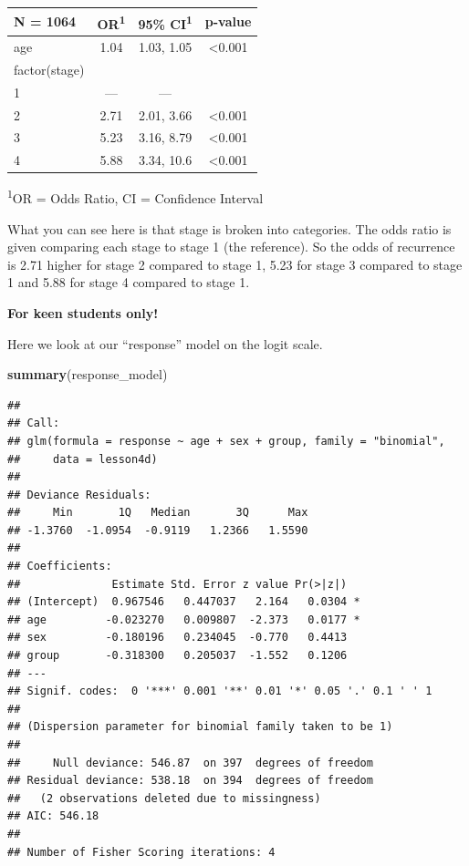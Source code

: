 \documentclass[]{book}
\newenvironment{Shaded}{\begin{snugshade}}{\end{snugshade}}
\newcommand{\KeywordTok}[1]{\textcolor[rgb]{0.13,0.29,0.53}{\textbf{#1}}}
\newcommand{\NormalTok}[1]{#1}
\begin{document}
\captionsetup[table]{labelformat=empty,skip=1pt}
\begin{longtable}{lccc}
\toprule
\textbf{N = 1064} & \textbf{OR}\textsuperscript{1} & \textbf{95\% CI}\textsuperscript{1} & \textbf{p-value} \\ 
\midrule
age & 1.04 & 1.03, 1.05 & <0.001 \\ 
factor(stage) &  &  &  \\ 
1 & --- & --- &  \\ 
2 & 2.71 & 2.01, 3.66 & <0.001 \\ 
3 & 5.23 & 3.16, 8.79 & <0.001 \\ 
4 & 5.88 & 3.34, 10.6 & <0.001 \\ 
\bottomrule
\end{longtable}
\vspace{-5mm}
\begin{minipage}{\linewidth}
\textsuperscript{1}OR = Odds Ratio, CI = Confidence Interval \\ 
\end{minipage}

What you can see here is that stage is broken into categories. The odds
ratio is given comparing each stage to stage 1 (the reference). So the
odds of recurrence is 2.71 higher for stage 2 compared to stage 1, 5.23
for stage 3 compared to stage 1 and 5.88 for stage 4 compared to stage
1.

\textbf{For keen students only!}

Here we look at our ``response'' model on the logit scale.

\begin{Shaded}
\begin{Highlighting}[]
\KeywordTok{summary}\NormalTok{(response_model)}
\end{Highlighting}
\end{Shaded}

\begin{verbatim}
## 
## Call:
## glm(formula = response ~ age + sex + group, family = "binomial", 
##     data = lesson4d)
## 
## Deviance Residuals: 
##     Min       1Q   Median       3Q      Max  
## -1.3760  -1.0954  -0.9119   1.2366   1.5590  
## 
## Coefficients:
##              Estimate Std. Error z value Pr(>|z|)  
## (Intercept)  0.967546   0.447037   2.164   0.0304 *
## age         -0.023270   0.009807  -2.373   0.0177 *
## sex         -0.180196   0.234045  -0.770   0.4413  
## group       -0.318300   0.205037  -1.552   0.1206  
## ---
## Signif. codes:  0 '***' 0.001 '**' 0.01 '*' 0.05 '.' 0.1 ' ' 1
## 
## (Dispersion parameter for binomial family taken to be 1)
## 
##     Null deviance: 546.87  on 397  degrees of freedom
## Residual deviance: 538.18  on 394  degrees of freedom
##   (2 observations deleted due to missingness)
## AIC: 546.18
## 
## Number of Fisher Scoring iterations: 4
\end{verbatim}
\end{document}
